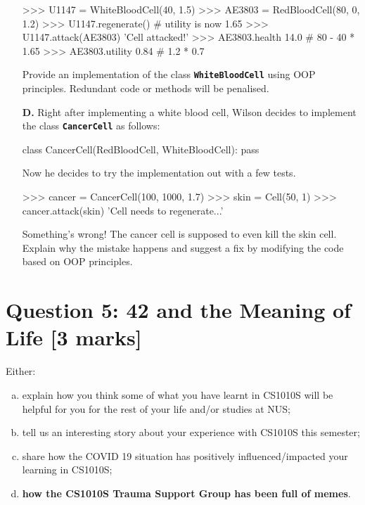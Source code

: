 \begin{enumerate}
\begin{python}
>>> U1147 = WhiteBloodCell(40, 1.5)
>>> AE3803 = RedBloodCell(80, 0, 1.2)
>>> U1147.regenerate()      # utility is now 1.65
>>> U1147.attack(AE3803)
'Cell attacked!'
>>> AE3803.health
14.0                        # 80 - 40 * 1.65
>>> AE3803.utility
0.84                        # 1.2 * 0.7
\end{python}
Provide an implementation of the class \colorbox{CornflowerBlue!20}{\texttt{\textbf{WhiteBloodCell}}} using OOP principles. Redundant code or methods will be 
penalised.
\begin{flushright}
    [6 marks]
\end{flushright}

\item[\textbf{D.}]
Right after implementing a white blood cell, Wilson decides to implement the class \colorbox{CornflowerBlue!20}{\texttt{\textbf{CancerCell}}} as follows:
\begin{python}
class CancerCell(RedBloodCell, WhiteBloodCell):
    pass
\end{python}
Now he decides to try the implementation out with a few tests.
\begin{python}
>>> cancer = CancerCell(100, 1000, 1.7)
>>> skin = Cell(50, 1)
>>> cancer.attack(skin)
'Cell needs to regenerate...'
\end{python}
Something's wrong! The cancer cell is supposed to even kill the skin cell. Explain why the mistake happens 
and suggest a fix by modifying the code based on OOP principles.
\begin{flushright}
    [5 marks]
\end{flushright}
\end{enumerate}

\section{Question 5: 42 and the Meaning of Life [3 marks]}
Either:
\begin{enumerate}[(a)]
    \item explain how you think some of what you have learnt in CS1010S will be helpful for
    you for the rest of your life and/or studies at NUS;
    \item tell us an interesting story about your
    experience with CS1010S this semester;
    \item share how the COVID 19 situation has positively
    influenced/impacted your learning in CS1010S;
    \item \textbf{how the CS1010S Trauma Support Group has been full of memes}.
\end{enumerate}

